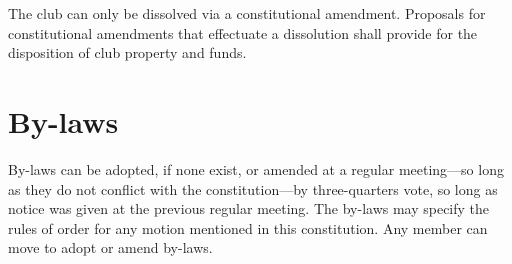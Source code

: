 \documentclass{article}
\begin{document}
The club can only be dissolved via a constitutional amendment. Proposals for
constitutional amendments that effectuate a dissolution shall provide for the
disposition of club property and funds.

\section{By-laws}

By-laws can be adopted, if none exist, or amended at a regular meeting---so long
as they do not conflict with the constitution---by three-quarters vote, so long
as notice was given at the previous regular meeting. The by-laws may specify the
rules of order for any motion mentioned in this constitution. Any member can
move to adopt or amend by-laws.





\end{document}
